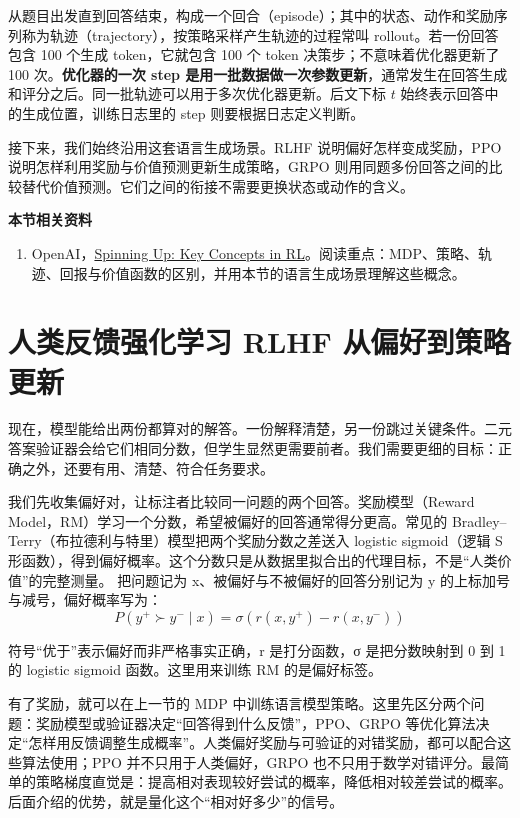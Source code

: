从题目出发直到回答结束，构成一个回合（episode）；其中的状态、动作和奖励序列称为轨迹（trajectory），按策略采样产生轨迹的过程常叫 rollout。若一份回答包含 100 个生成 token，它就包含 100 个 token 决策步；不意味着优化器更新了 100 次。\textbf{优化器的一次 step 是用一批数据做一次参数更新}，通常发生在回答生成和评分之后。同一批轨迹可以用于多次优化器更新。后文下标 $t$ 始终表示回答中的生成位置，训练日志里的 step 则要根据日志定义判断。

接下来，我们始终沿用这套语言生成场景。RLHF 说明偏好怎样变成奖励，PPO 说明怎样利用奖励与价值预测更新生成策略，GRPO 则用同题多份回答之间的比较替代价值预测。它们之间的衔接不需要更换状态或动作的含义。

\textbf{本节相关资料}
\begin{enumerate}
    \item OpenAI，\href{https://spinningup.openai.com/en/latest/spinningup/rl_intro.html}{Spinning Up: Key Concepts in RL}。阅读重点：MDP、策略、轨迹、回报与价值函数的区别，并用本节的语言生成场景理解这些概念。
\end{enumerate}

\section{人类反馈强化学习 RLHF 从偏好到策略更新}\label{人类反馈强化学习 RLHF 从偏好到策略更新}

现在，模型能给出两份都算对的解答。一份解释清楚，另一份跳过关键条件。二元答案验证器会给它们相同分数，但学生显然更需要前者。我们需要更细的目标：正确之外，还要有用、清楚、符合任务要求。

我们先收集偏好对，让标注者比较同一问题的两个回答。奖励模型（Reward Model，RM）学习一个分数，希望被偏好的回答通常得分更高。常见的 Bradley--Terry（布拉德利与特里）模型把两个奖励分数之差送入 logistic sigmoid（逻辑 S 形函数），得到偏好概率。这个分数只是从数据里拟合出的代理目标，不是``人类价值''的完整测量。 把问题记为 x、被偏好与不被偏好的回答分别记为 y 的上标加号与减号，偏好概率写为：
\[P\left( y^{+} \succ y^{-} \mid x \right) = \sigma\left( r\left( x,y^{+} \right) - r\left( x,y^{-} \right) \right)\]

符号``优于''表示偏好而非严格事实正确，r 是打分函数，σ 是把分数映射到 0 到 1 的 logistic sigmoid 函数。这里用来训练 RM 的是偏好标签。

有了奖励，就可以在上一节的 MDP 中训练语言模型策略。这里先区分两个问题：奖励模型或验证器决定``回答得到什么反馈''，PPO、GRPO 等优化算法决定``怎样用反馈调整生成概率''。人类偏好奖励与可验证的对错奖励，都可以配合这些算法使用；PPO 并不只用于人类偏好，GRPO 也不只用于数学对错评分。最简单的策略梯度直觉是：提高相对表现较好尝试的概率，降低相对较差尝试的概率。后面介绍的优势，就是量化这个``相对好多少''的信号。

